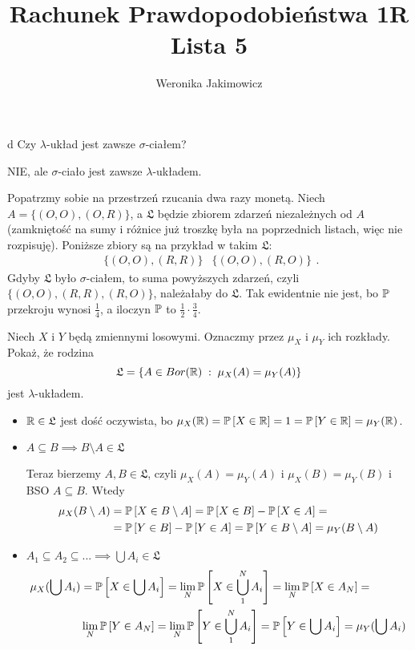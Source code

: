 \documentclass{article}
\title{Rachunek Prawdopodobieństwa 1R\\{\normalsize Lista 5}}
\author{Weronika Jakimowicz}
\date{}
\begin{document}
\maketitle\thispagestyle{empty}

\begin{problem}[1]{d}
Czy $\lambda$-układ jest zawsze $\sigma$-ciałem?
\end{problem}

NIE, ale $\sigma$-ciało jest zawsze $\lambda$-układem.

Popatrzmy sobie na przestrzeń rzucania dwa razy monetą. Niech $A=\{(O, O), (O, R)\}$, a $\mathfrak{L}$ będzie zbiorem zdarzeń niezależnych od $A$ (zamkniętość na sumy i różnice już troszkę była na poprzednich listach, więc nie rozpisuję). Poniższe zbiory są na przykład w takim $\mathfrak{L}$:
$$\begin{matrix}\{(O, O), (R, R)\} & \{(O, O), (R, O)\}\end{matrix}.$$
Gdyby $\mathfrak{L}$ było $\sigma$-ciałem, to suma powyższych zdarzeń, czyli $\{(O, O), (R, R), (R, O)\}$, należałaby do $\mathfrak{L}$. Tak ewidentnie nie jest, bo $\prob$ przekroju wynosi $\frac{1}{4}$, a iloczyn $\prob$ to $\frac{1}{2}\cdot\frac{3}{4}$.

\begin{problem}[2]{}
Niech $X$ i $Y$ będą zmiennymi losowymi. Oznaczmy przez $\mu_X$ i $\mu_Y$ ich rozkłady. Pokaż, że rodzina
$$\mathfrak{L}=\{A\in Bor(\mathbb{R})\;:\;\mu_X(A)=\mu_Y(A)\}$$
jest $\lambda$-układem.
\end{problem}

\begin{itemize}
    \item $\mathbb{R}\in\mathfrak{L}$ jest dość oczywista, bo $\mu_X(\R)=\prob{X\in\R}=1=\prob{Y\in\R}=\mu_Y(\R)$.
    \item $A\subseteq B\implies B\setminus A\in\mathfrak{L}$

    Teraz bierzemy $A,B\in\mathfrak{L}$, czyli $\mu_X(A)=\mu_Y(A)$ i $\mu_X(B)=\mu_Y(B)$ i BSO $A\subseteq B$. Wtedy
    \begin{align*}
        \mu_X(B\setminus A)&=\prob{X\in B\setminus A}=\prob{X\in B}-\prob{X\in A}=\\
        &=\prob{Y\in B}-\prob{Y\in A}=\prob{Y\in B\setminus A}=\mu_Y(B\setminus A)
    \end{align*}
    \item $A_1\subseteq A_2\subseteq...\implies\bigcup A_i\in\mathfrak{L}$
    \begin{align*}
        \mu_X(\bigcup A_i)&=\prob{X\in\bigcup A_i}=\lim_N\prob{X\in\bigcup_1^NA_i}=\lim_N\prob{X\in A_N}=\\
        &\lim_N\prob{Y\in A_N}=\lim_N\prob{Y\in\bigcup_1^NA_i}=\prob{Y\in\bigcup A_i}=\mu_Y(\bigcup A_i)
    \end{align*}
\end{itemize}
\end{document}
